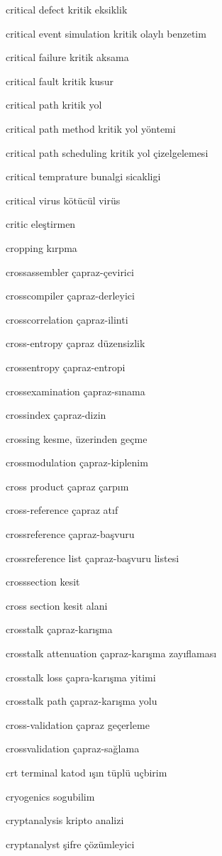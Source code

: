 \documentclass[12pt,fleqn]{article}\usepackage{../../common}
\begin{document}
critical defect kritik eksiklik

critical event simulation kritik olaylı benzetim

critical failure kritik aksama

critical fault kritik kusur

critical path kritik yol

critical path method kritik yol yöntemi

critical path scheduling kritik yol çizelgelemesi

critical temprature bunalgi sicakligi

critical virus kötücül virüs

critic eleştirmen

cropping kırpma

crossassembler çapraz-çevirici

crosscompiler çapraz-derleyici

crosscorrelation çapraz-ilinti

cross-entropy çapraz düzensizlik

crossentropy çapraz-entropi

crossexamination çapraz-sınama

crossindex çapraz-dizin

crossing kesme, üzerinden geçme

crossmodulation çapraz-kiplenim

cross product çapraz çarpım

cross-reference çapraz atıf

crossreference çapraz-başvuru

crossreference list çapraz-başvuru listesi

crosssection kesit

cross section kesit alani

crosstalk çapraz-karışma

crosstalk attenuation çapraz-karışma zayıflaması

crosstalk loss çapra-karışma yitimi

crosstalk path çapraz-karışma yolu

cross-validation çapraz geçerleme

crossvalidation çapraz-sağlama

crt terminal katod ışın tüplü uçbirim

cryogenics sogubilim

cryptanalysis kripto analizi

cryptanalyst şifre çözümleyici
\end{document}
